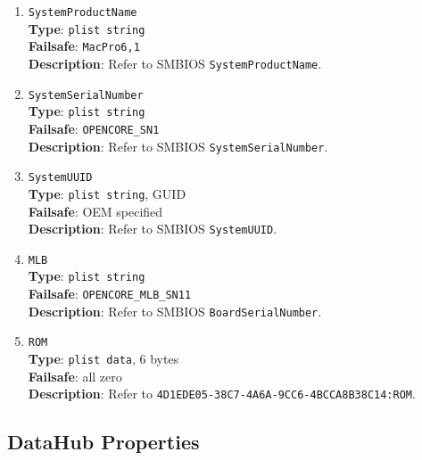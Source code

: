 \documentclass[]{article}
\begin{document}
\begin{enumerate}
\item
  \texttt{SystemProductName}\\
  \textbf{Type}: \texttt{plist\ string}\\
  \textbf{Failsafe}: \texttt{MacPro6,1}\\
  \textbf{Description}: Refer to SMBIOS \texttt{SystemProductName}.
\item
  \texttt{SystemSerialNumber}\\
  \textbf{Type}: \texttt{plist\ string}\\
  \textbf{Failsafe}: \texttt{OPENCORE\_SN1}\\
  \textbf{Description}: Refer to SMBIOS \texttt{SystemSerialNumber}.
\item
  \texttt{SystemUUID}\\
  \textbf{Type}: \texttt{plist\ string}, GUID\\
  \textbf{Failsafe}: OEM specified\\
  \textbf{Description}: Refer to SMBIOS \texttt{SystemUUID}.
\item
  \texttt{MLB}\\
  \textbf{Type}: \texttt{plist\ string}\\
  \textbf{Failsafe}: \texttt{OPENCORE\_MLB\_SN11}\\
  \textbf{Description}: Refer to SMBIOS \texttt{BoardSerialNumber}.
\item
  \texttt{ROM}\\
  \textbf{Type}: \texttt{plist\ data}, 6 bytes\\
  \textbf{Failsafe}: all zero\\
  \textbf{Description}: Refer to
  \texttt{4D1EDE05-38C7-4A6A-9CC6-4BCCA8B38C14:ROM}.

\end{enumerate}

\subsection{DataHub Properties}\label{platforminfodatahub}
\end{document}
